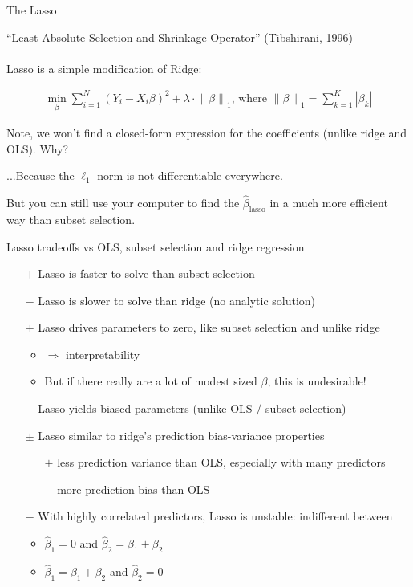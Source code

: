 \documentclass[mathserif, aspectratio=169]{beamer}
\newcommand{\norm}[1]{\left\lVert #1 \right\rVert}
\begin{document}
\begin{frame}{The Lasso}

“Least Absolute Selection and Shrinkage Operator” (Tibshirani, 1996)\\~\\

Lasso is a simple modification of Ridge:

\begin{align*}
\min_\beta \sum_{i=1}^N \left(Y_i - X_i \beta \right)^2+\lambda \cdot \norm{\beta}_1\text{, where }\norm{\beta}_1=\sum_{k=1}^K |\beta_k|
\end{align*}

Note, we won't find a closed-form expression for the coefficients (unlike ridge and OLS).  Why?

\pause

...Because the $\ell_1$ norm is not differentiable everywhere.

\vspace{5mm}

But you can still use your computer to find the $\hat{\beta}_\text{lasso}$ in a much more efficient way than subset selection.  

\end{frame}

\begin{frame}{Lasso tradeoffs vs OLS, subset selection and ridge regression}

\pause

\begin{enumerate}
\item[$+$] Lasso is faster to solve than subset selection
\item[$-$] Lasso is slower to solve than ridge (no analytic solution)
\item[$+$] Lasso drives parameters to zero, like subset selection and unlike ridge
\begin{itemize}
\item $\Rightarrow$ interpretability
\item But if there really are a lot of modest sized $\beta$, this is undesirable!
\end{itemize}
\item[$-$] Lasso yields biased parameters (unlike OLS / subset selection)
\item[$\pm$] Lasso similar to ridge's prediction bias-variance properties 
\begin{itemize}
\item[$+$] less prediction variance than OLS, especially with many  predictors 
\item[$-$] more prediction bias than OLS
\end{itemize}
\item[$-$] With highly correlated predictors, Lasso is unstable: indifferent between 
\begin{itemize}
\item $\hat{\beta}_1=0$ and $\hat{\beta}_2= \beta_1+\beta_2$
\item $\hat{\beta}_1= \beta_1+\beta_2$ and $\hat{\beta}_2=0$
\end{itemize}
\end{enumerate}

\end{frame}
\end{document}
